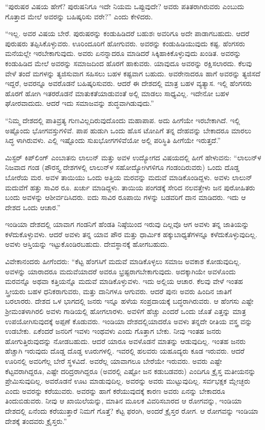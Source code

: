 “ಪುರುಷರ ವಿಷಯ ಹೇಗೆ? ಪುರುಷನಿಗೂ ಇದೇ ನಿಯಮ ಒಪ್ಪುವುದೇ? ಅವರು ಪತಿತರಾಗಿರುವರು ಎಂಬುದು ಗೊತ್ತಾದ ಮೇಲೆ ಅವರನ್ನು ಬಹಿಷ್ಕರಿಸು ವರೇ?” ಎಂದು ಕೇಳಿದರು.

“ಇಲ್ಲ. ಅವರ ವಿಷಯ ಬೇರೆ. ಪುರುಷರನ್ನು ಕಂಡುಹಿಡಿದರೆ ಬಹುಶಃ ಅವರಿಗೂ ಅದೇ ಪಾಡಾಗಬಹುದು. ಆದರೆ ಪುರುಷರು ತಪ್ಪಿಸಿಕೊಳ್ಳುವರು. ಊರಿಂದೂರಿಗೆ ಹೋಗುವರು. ಅವರನ್ನು ಕಂಡುಹಿಡಿಯುವುದು ಕಷ್ಟ. ಹೆಂಗಸರು ಮನೆಯಲ್ಲೇ ಇರಬೇಕಾಗುವುದು. ಅವರು ಏನನ್ನಾದರೂ ಮಾಡಿದರೆ ಸಿಕ್ಕಿಹಾಕಿಕೊಳ್ಳುವುದು ಖಂಡಿತ. ಅವರನ್ನು ಕಂಡುಹಿಡಿದ ಮೇಲೆ ಅವರನ್ನು ಸಮಾಜದಿಂದ ಹೊರಗೆ ಹಾಕುವರು. ಯಾವುದೂ ಅವರನ್ನು ರಕ್ಷಿಸಲಾರದು. ಕೆಲವು ವೇಳೆ ತಂದೆ ಮಗಳನ್ನು ತ್ಯಜಿಸುವಾಗ ಸಹಿಸಲು ಬಹಳ ಕಷ್ಟವಾಗ ಬಹುದು. ಅವರೇನಾದರೂ ಹಾಗೆ ಅವರನ್ನು ತ್ಯಜಿಸದೆ ಇದ್ದರೆ, ಅವರನ್ನೂ ಅವರೊಡನೆ ಬಹಿಷ್ಕರಿಸುವರು. ಆದರೆ ಈ ದೇಶದಲ್ಲಿ ಮಾತ್ರ ಬಹಳ ವ್ಯತ್ಯಾಸ. ಇಲ್ಲಿ ಹೆಂಗಸರು ಹೊರಗೆ ಹೋಗಿ ಇತರರೊಡನೆ ಮಾತುಕತೆಯಾಡುವಂತೆ ಅಲ್ಲಿ ಮಾಡಲು ಸಾಧ್ಯವಿಲ್ಲ. ಇದೇನೋ ಬಹಳ ಘೋರವಾದುದು. ಆದರೆ ಇದು ಸಮಾಜವನ್ನು ಶುದ್ಧವಾಗಿಡುವುದು.”

“ನಿಮ್ಮ ದೇಶದಲ್ಲಿ ಪಾತಿವ್ರತ್ಯ ಗುಣವಿಲ್ಲದಿರುವುದೊಂದು ಮಹಾಪಾಪ. ಅದು ಹೀಗೆಯೇ ಇರಬೇಕಾಗಿದೆ. ಇಲ್ಲಿ ಅಷ್ಟೊಂದು ಭೋಗವಸ್ತುಗಳಿವೆ. ಪಾಪ ಹುಡುಗಿ ಒಂದು ಹೊಸ ಟೋಪಿಗೆ ತನ್ನ ದೇಹವನ್ನು ಬೇಕಾದರೂ ಮಾರಲು ಸಿದ್ಧ ಳಾಗಿರುವಳು. ಎಲ್ಲಿ ಇಷ್ಟೊಂದು ಸುಖಭೋಗಗಳಿವೆಯೋ ಅಲ್ಲಿ ಪರಿಸ್ಥಿತಿ ಹೀಗೆಯೇ ಇರುತ್ತದೆ.”

ಮಿಸ್ಟರ್​ ಕಿಪ್​ಲಿಂಗ್​ ಎಂಬಾತನು ಲಾಲುನ್​ ಮತ್ತು ಅವಳ ಉದ್ಯೋಗದ ವಿಷಯದಲ್ಲಿ ಹೀಗೆ ಹೇಳುವನು: “ಲಾಲುನ್​ಳ ನಿಜವಾದ ಗಂಡ (ಪೌರಸ್ತ್ಯ ದೇಶಗಳಲ್ಲಿ ಲಾಲುನ್​ಳ ಸಹೋದ್ಯೋಗಿಗಳಿಗೂ ಗಂಡಂದಿರುವರು) ಒಂದು ದೊಡ್ಡ ಬೋರೆಯ ಮರ. ಅವಳ ತಾಯಿಯು ಒಂದು ಅತ್ತಿಯ ಮರವನ್ನು ಮದುವೆ ಮಾಡಿಕೊಂಡಿದ್ದಳು. ಅವಳು ಲಾಲುನ್​ ಮದುವೆಗೆ ಹತ್ತು ಸಾವಿರ ರೂ. ಖರ್ಚು ಮಾಡಿದ್ದಳು. ತಾಯಿಯ ಪಂಗಡಕ್ಕೆ ಸೇರಿದ ನಲವತ್ತೇಳು ಜನ ಪುರೋಹಿತರು ಬಂದು ಅವಳನ್ನು ಆಶೀರ್ವದಿಸಿದರು. ಐದು ಸಾವಿರ ರೂಪಾಯಿ ಗಳನ್ನು ಬಡವರಿಗೆ ದಾನ ಮಾಡಿದರು. ಇದು ಆ ದೇಶದ ಒಂದು ಆಚಾರ.”

ಇಂಡಿಯಾ ದೇಶದಲ್ಲಿ ಯಾವಾಗ ಗಂಡನಿಗೆ ಹೆಂಡತಿ ನಿಷ್ಠೆಯಿಂದ ಇರುವು ದಿಲ್ಲವೊ ಆಗ ಅವಳು ತನ್ನ ಜಾತಿಯನ್ನು ಕಳೆದುಕೊಳ್ಳುವಳು. ಆದರೆ ಅವಳು ತನ್ನ ಯಾವ ಪೌರ ಮತ್ತು ಧಾರ್ಮಿಕ ಹಕ್ಕುಬಾಧ್ಯತೆಗಳನ್ನೂ ಕಳೆದುಕೊಳ್ಳುವುದಿಲ್ಲ. ಅವಳು ಆಸ್ತಿಯನ್ನು ಇಟ್ಟುಕೊಂಡಿರಬಹುದು. ದೇವಸ್ಥಾನಕ್ಕೆ ಹೋಗಬಹುದು.

ವಿವೇಕಾನಂದರು ಹೀಗೆಂದರು: “ಕೆಟ್ಟ ಹೆಂಗಸಿಗೆ ಮದುವೆ ಮಾಡಿಕೊಳ್ಳಲು ಸಮಾಜ ಅವಕಾಶ ಕೋಡುವುದಿಲ್ಲ. ಅವಳನ್ನು ಯಾರಾದರೂ ಮದುವೆಯಾದರೆ ಅವರೂ ಭ್ರಷ್ಟರಾಗಬೇಕಾಗುವುದು. ಅದಕ್ಕಾಗಿಯೇ ಅವಳೊಂದು ಮರವನ್ನೊ ಅಥವಾ ಕತ್ತಿಯನ್ನೊ ಮದುವೆ ಮಾಡಿಕೊಳ್ಳುವಳು. ಇದು ಅಲ್ಲಿಯ ಆಚಾರ. ಕೆಲವು ವೇಳೆ ಇಂತಹ ಸ್ತ್ರೀಯರು ಬಹಳ ಧನಿಕರಾಗುವರು, ಮತ್ತು ದಾನಿಗಳೂ ಆಗುವರು. ಆದರೆ ಪುನಃ ಅವರು ಹಿಂದಿನ ಜಾತಿಗೆ ಬರಲಾರರು. ದೇಶದ ಒಳ ಭಾಗದಲ್ಲಿ ಜನರು ಇನ್ನೂ ಹಳೆಯ ಸಂಪ್ರದಾಯಕ್ಕೆ ಬದ್ಧರಾಗಿರುವರು. ಆ ಹೆಂಗಸು ಎಷ್ಟೇ ಶ‍್ರೀಮಂತಳಾಗಿರಲಿ ಅವಳು ಗಾಡಿಯಲ್ಲಿ ಹೋಗಲಾರಳು. ಅವಳಿಗೆ ಹೆಚ್ಚು ಎಂದರೆ ಒಂದು ಜೊತೆ ಎತ್ತನ್ನು ಮಾತ್ರ ಉಪಯೋಗಿಸುವುದಕ್ಕೆ ಅಪ್ಪಣೆ ಕೊಡುವರು. ಇಂಡಿಯಾ ದೇಶದಲ್ಲಿಯಾದರೊ ಅವಳು ತನ್ನದೇ ರೀತಿಯ ವಸ್ತ್ರ ವನ್ನು ಉಡಬೇಕು. ಏಕೆಂದರೆ ಜನರಿಗೆ ಇವಳು ಇಂಥವಳು ಎಂದು ಗೊತ್ತಾಗ ಬೇಕು. ನೀವು ಇಂತಹ ಜನರು ಹೋಗುತ್ತಿರುವುದನ್ನು ನೋಡಬಹುದು. ಆದರೆ ಯಾರೂ ಅವಳೊಡನೆ ಮಾತನ್ನು ಆಡುವುದಿಲ್ಲ. ಇಂತಹ ಜನರು ಹೆಚ್ಚಾಗಿ ಇರುವುದು ದೊಡ್ಡ ದೊಡ್ಡ ಊರುಗಳಲ್ಲಿ. ಇವರಲ್ಲಿ ಹಲವರು ಯಹೂದ್ಯರು ಕೂಡ ಇರುವರು. ಆದರೆ ಊರಿನಲ್ಲಿ ಅವರಿಗೆಲ್ಲ ಬೇರೆ ಸ್ಥಳವಿದೆ. ಅವರೆಲ್ಲ ಯಾವಾಗಲೂ ಬೇರೆಯೇ ಇರುವರು. ಅವರು ಎಷ್ಟೇ ಕೆಟ್ಟವರಾಗಿದ್ದರೂ, ಎಷ್ಟೇ ದರಿದ್ರರಾಗಿದ್ದರೂ (ಅವರಲ್ಲಿ ಎಷ್ಟೋ ಜನ ಕಡುಬಡವರು) ಎಂದಿಗೂ ಕ್ರೈಸ್ತ ಮತೀಯನನ್ನು ಪ್ರೇಮಿಸುವುದಿಲ್ಲ. ಅವರೊಡನೆ ಊಟ ಮಾಡುವುದಿಲ್ಲ. ಅವರನ್ನು ಅವರು ಮುಟ್ಟುವುದಿಲ್ಲ. ಸರ್ವಭಕ್ಷಕ ಮ್ಲೇಚ್ಛರು ಎಂದು ಅವರನ್ನು ಕರೆಯುವರು. ಅವರನ್ನು ಹಾಗೆ ಕರೆಯುವುದಕ್ಕೆ ಕಾರಣ ಅವರು ಏನನ್ನು ಬೇಕಾದರೂ ತಿಂದುಬಿಡುವರು. ನೀವು ಆ ಖಾಯಿಲೆಯನ್ನು, ಮಾತಿನ ಮೂಲಕ ವಿವರಿಸಬಾರದ ಆ ರೋಗವನ್ನು, ಇಂಡಿಯಾ ದೇಶದಲ್ಲಿ ಏನೆಂದು ಕರೆಯುತ್ತಾರೆ ನಿಮಗೆ ಗೊತ್ತೆ? ಕೆಟ್ಟ ಫರಂಗಿ, ಅಂದರೆ ಕ್ರೈಸ್ತರ ರೋಗ. ಆ ರೋಗವನ್ನು ಇಂಡಿಯಾ ದೇಶಕ್ಕೆ ತಂದವರು ಕ್ರೈಸ್ತರು.”

